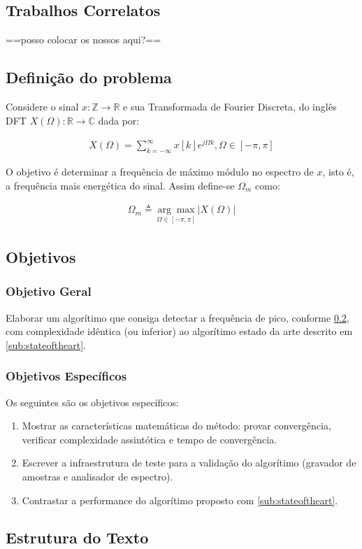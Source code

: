
\subsection{Trabalhos Correlatos}
==posso colocar os nossos aqui?==

\subsection{Definição do problema}
\label{sub:model}

Considere o sinal $x:\mathbb{Z}\to\mathbb{R}$ e sua Transformada de Fourier Discreta, do inglês \ac{DFT} $X(\Omega):\mathbb{R}\to\mathbb{C}$ dada por:

\begin{align}
    \label{eq:dft}
    X(\Omega) = \sum_{k = -\infty}^{\infty} x[k] e^{j\Omega k} , \Omega \in [-\pi,\pi]
\end{align}

O objetivo é determinar a frequência de máximo módulo no espectro de $x$, isto é, a frequência mais energética do sinal. Assim define-se $\Omega_m$ como:

\begin{align}
    \label{eq:omegam}
    \Omega_m \triangleq \underset{\Omega \in [-\pi,\pi]}{\arg \max} \lvert X(\Omega) \rvert
\end{align}

\subsection{Objetivos}
\subsubsection{Objetivo Geral}

Elaborar um algorítimo que consiga detectar a frequência de pico, conforme \ref{sub:model}, com complexidade idêntica (ou inferior) ao algorítimo estado da arte descrito em \ref{sub:stateoftheart}.

\subsubsection{Objetivos Específicos}

Os seguintes são os objetivos específicos:

\begin{enumerate}
    \item Mostrar as características matemáticas do método: provar convergência, verificar complexidade assintótica e tempo de convergência.
    \item Escrever a infraestrutura de teste para a validação do algorítimo (gravador de amostras e analisador de espectro).
    \item Contrastar a performance do algorítimo proposto com \ref{sub:stateoftheart}.
\end{enumerate}

\subsection{Estrutura do Texto}